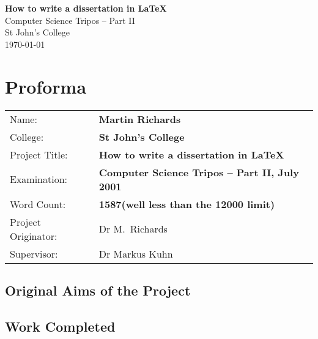 \documentclass[12pt,a4paper,twoside,openright]{report}
\begin{document}





\pagestyle{empty}


\vspace*{60mm}
\begin{center}
  \Huge
  \textbf{How to write a dissertation in \LaTeX} \\[5mm]
  Computer Science Tripos -- Part II \\[5mm]
  St John's College \\[5mm]
  \today %
\end{center}


\pagestyle{plain}

\chapter*{Proforma}

{\large
  \begin{tabular}{ll}
    Name:               & \bf Martin Richards                       \\
    College:            & \bf St John's College                     \\
    Project Title:      & \bf How to write a dissertation in \LaTeX \\
    Examination:        & \bf Computer Science Tripos -- Part II, July 2001  \\
    Word Count:         & \bf 1587\footnotemark[1]
                          (well less than the 12000 limit)  \\
    Project Originator: & Dr M.~Richards                    \\
    Supervisor:         & Dr Markus Kuhn                    \\ 
  \end{tabular}
} 


\section*{Original Aims of the Project}

\section*{Work Completed}
\end{document}
